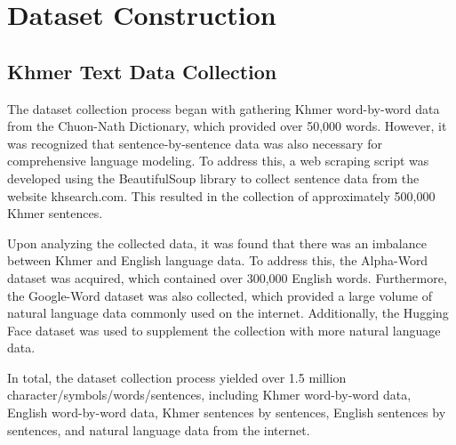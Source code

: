 
\chapter{Dataset Construction}
\label{ch:dataset}
\section{Khmer Text Data Collection}
\label{sec:text-source}

The dataset collection process began with gathering Khmer word-by-word data from the 
Chuon-Nath Dictionary, which provided over 50,000 words. However, it was recognized 
that sentence-by-sentence data was also necessary for comprehensive language modeling. 
To address this, a web scraping script was developed using the BeautifulSoup library 
to collect sentence data from the website khsearch.com. This resulted in the collection 
of approximately 500,000 Khmer sentences.

Upon analyzing the collected data, it was found that there was an imbalance between 
Khmer and English language data. To address this, the Alpha-Word dataset was acquired,
which contained over 300,000 English words. Furthermore, the Google-Word dataset 
was also collected, which provided a large volume of natural language data commonly 
used on the internet. Additionally, the Hugging Face dataset was used to supplement 
the collection with more natural language data.

In total, the dataset collection process yielded over 1.5 million 
character/symbols/words/sentences, including Khmer word-by-word data, 
English word-by-word data, Khmer sentences by sentences, English 
sentences by sentences, and natural language data from the internet.

